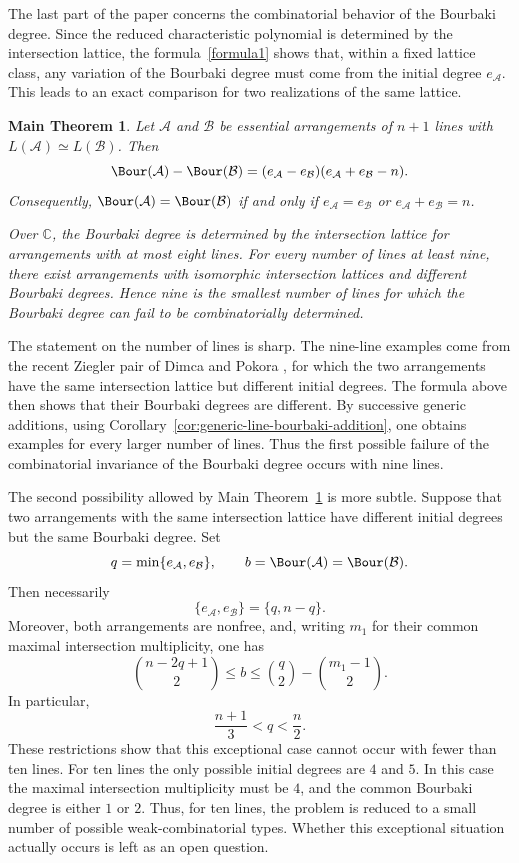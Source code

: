 \documentclass[11pt]{amsart}   %
\newtheorem{mthm}{Main Theorem}
\theoremstyle{definition}
\def\NZQ{\mathbb}               %
\def\CC{{\NZQ C}}
\def\A{{\mathcal A}}
\def\B{{\mathcal B}}
\begin{document}
\medskip

The last part of the paper concerns the combinatorial behavior of the
Bourbaki degree. Since the reduced characteristic polynomial is
determined by the intersection lattice, the formula~\eqref{formula1}
shows that, within a fixed lattice class, any variation of the
Bourbaki degree must come from the initial degree $e_\A$. This leads
to an exact comparison for two realizations of the same lattice.

\begin{mthm}
\label{main:combinatorial}
Let $\A$ and $\B$ be essential arrangements of $n+1$ lines with
$L(\A)\simeq L(\B)$. Then
\[
\Bour(\A)-\Bour(\B)
=
(e_\A-e_\B)(e_\A+e_\B-n).
\]
Consequently, $\Bour(\A)=\Bour(\B)$ if and only if
$e_\A=e_\B$ or $e_\A+e_\B=n$.

Over $\CC$, the Bourbaki degree is determined by the intersection
lattice for arrangements with at most eight lines. For every number
of lines at least nine, there exist arrangements with isomorphic
intersection lattices and different Bourbaki degrees. Hence nine is
the smallest number of lines for which the Bourbaki degree can fail
to be combinatorially determined.
\end{mthm}

The statement on the number of lines is sharp. The nine-line examples come from the recent Ziegler pair of Dimca and
Pokora \cite{Dimca-Pokora-nine}, for which the two arrangements have
the same intersection lattice but different initial degrees. The
formula above then shows that their Bourbaki degrees are different. 
By successive generic additions, using
Corollary~\ref{cor:generic-line-bourbaki-addition}, one obtains
examples for every larger number of lines. Thus the first possible failure of the combinatorial
invariance of the Bourbaki degree occurs with nine lines.

The second possibility allowed by Main
Theorem~\ref{main:combinatorial} is more subtle. Suppose that two
arrangements with the same intersection lattice have different
initial degrees but the same Bourbaki degree. Set
\[
q=\min\{e_\A,e_\B\},
\qquad
b=\Bour(\A)=\Bour(\B).
\]
Then necessarily
\[
\{e_\A,e_\B\}=\{q,n-q\}.
\]
Moreover, both arrangements are nonfree, and, writing $m_1$ for their
common maximal intersection multiplicity, one has
\[
\binom{n-2q+1}{2}
\leq
b
\leq
\binom q2-\binom{m_1-1}{2}.
\]
In particular,
\[
\frac{n+1}{3}<q<\frac n2.
\]
These restrictions show that this exceptional case cannot occur with
fewer than ten lines. For ten lines the only possible initial degrees
are $4$ and $5$. In this case the maximal intersection multiplicity
must be $4$, and the common Bourbaki degree is either $1$ or $2$.
Thus, for ten lines, the problem is reduced to a small number of
possible weak-combinatorial types. Whether this exceptional situation
actually occurs is left as an open question.
\end{document}
